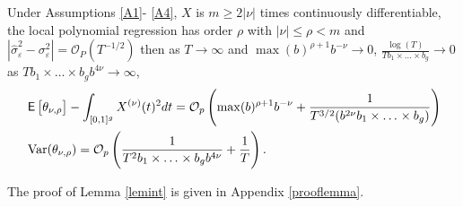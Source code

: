\begin{lemma}
\label{lemint} 
Under Assumptions \ref{A1}- \ref{A4}, $X$ is $m\geq 2 |\nu|$ times  continuously  differentiable, the local polynomial regression has order $\rho$ with $|\nu| \leq \rho < m$ and $|\hat{\sigma}_{\varepsilon}^2-\sigma_{\varepsilon}^2|=\mathcal{O}_P(T^{-1/2}) $ then as $T \rightarrow \infty$ and $\max(b) ^{\rho+1} b^{-\nu} \rightarrow 0$, $\frac{\log(T)}{T b_1\times\dots \times b_g} \rightarrow 0$ as $T b_1 \times \dots \times b_g b^{4\nu}\rightarrow \infty$,
\begin{equation}
\begin{split}
&\mathop{\mbox{\sf E}} \left[\theta_{\nu,\rho}\right]- \int_{[0,1]^g} X^{(\nu)}(t)^2 dt =\mathcal{O}_p \left(\max(b)^{\rho+1} b^{-\nu} + \frac{1}{T^{3/2} (b^{2\nu} b_1 \times \ldots{\kern -1pt} \times b_g)}  \right) \\ 
&\operatorname{Var}(\theta_{\nu,\rho})=  \mathcal{O}_p\left( \frac{1}{T^2 b_1 \times \ldots{\kern -1pt} \times b_g  b^{4\nu}  }+ \frac{1}{T}\right).
\end{split}
\end{equation}
\end{lemma}
The proof of Lemma \ref{lemint} is given in Appendix \ref{prooflemma}.


